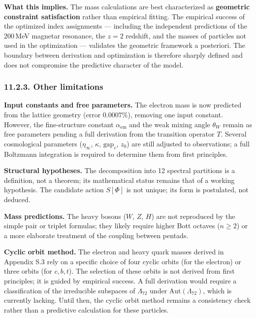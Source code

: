 \documentclass[11pt]{article}
\begin{document}
\textbf{What this implies.} The mass calculations are best characterized
as \textbf{geometric constraint satisfaction} rather than empirical
fitting. The empirical success of the optimized index assignments ---
including the independent predictions of the 200\,MeV magnetar
resonance, the \(z=2\) redshift, and the masses of particles not used in
the optimization --- validates the geometric framework a posteriori. The
boundary between derivation and optimization is therefore sharply
defined and does not compromise the predictive character of the model.

\hypertarget{other-limitations}{%
\subsubsection{11.2.3. Other limitations}\label{other-limitations}}

\textbf{Input constants and free parameters.} The electron mass is now
predicted from the lattice geometry (error \(0.0007\%\)), removing one
input constant. However, the fine-structure constant
\(\alpha_{\text{em}}\) and the weak mixing angle \(\theta_W\) remain as
free parameters pending a full derivation from the transition operator
\(T\). Several cosmological parameters (\(\eta_\infty\), \(\kappa\),
\(\text{gap}_c\), \(z_0\)) are still adjusted to observations; a full
Boltzmann integration is required to determine them from first
principles.

\textbf{Structural hypotheses.} The decomposition into 12 spectral
partitions is a definition, not a theorem; its mathematical status
remains that of a working hypothesis. The candidate action \(S[\Phi]\)
is not unique; its form is postulated, not deduced.

\textbf{Mass predictions.} The heavy bosons (\(W\), \(Z\), \(H\)) are
not reproduced by the simple pair or triplet formulas; they likely
require higher Bott octaves (\(n\ge2\)) or a more elaborate treatment of
the coupling between pentads.

\textbf{Cyclic orbit method.} The electron and heavy quark masses
derived in Appendix S.3 rely on a specific choice of four cyclic orbits
(for the electron) or three orbits (for \(c,b,t\)). The selection of
these orbits is not derived from first principles; it is guided by
empirical success. A full derivation would require a classification of
the irreducible subspaces of \(\Lambda_{72}\) under
\(\mathrm{Aut}(\Lambda_{72})\), which is currently lacking. Until then,
the cyclic orbit method remains a consistency check rather than a
predictive calculation for these particles.
\end{document}
